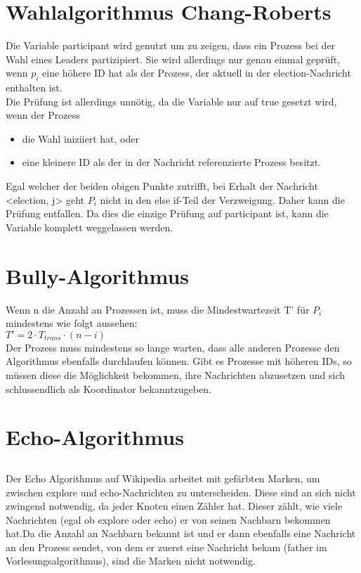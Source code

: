 \documentclass[a4paper,9pt]{article}
\begin{document}
\section{Wahlalgorithmus Chang-Roberts}
Die Variable participant wird genutzt um zu zeigen, dass ein Prozess bei der Wahl eines Leaders partizipiert. Sie wird allerdings nur genau einmal gepr\"uft, wenn $p_{i}$ eine h\"ohere ID hat als der Prozess, der aktuell in der election-Nachricht enthalten ist. \\
Die Pr\"ufung ist allerdings unn\"otig, da die Variable nur auf true gesetzt wird, wenn der Prozess
\begin{itemize}
\item die Wahl iniziiert hat, oder
\item eine kleinere ID als der in der Nachricht referenzierte Prozess besitzt.
\end{itemize}
Egal welcher der beiden obigen Punkte zutrifft, bei Erhalt der Nachricht \\
<election, j> geht $P_{i}$ nicht in den else if-Teil der Verzweigung. Daher kann die Pr\"ufung entfallen. Da dies die einzige Pr\"ufung auf participant ist, kann die Variable komplett weggelassen werden.

\section{Bully-Algorithmus}
Wenn n die Anzahl an Prozessen ist, muss die Mindestwartezeit T' f\"ur $P_{i}$ mindestens wie folgt aussehen: \\
$T' = 2 \cdot T_{trans} \cdot (n-i)$ \\
Der Prozess muss mindestens so lange warten, dass alle anderen Prozesse den Algorithmus ebenfalls durchlaufen k\"onnen. Gibt es Prozesse mit h\"oheren IDs, so m\"ussen diese die M\"oglichkeit bekommen, ihre Nachrichten abzusetzen und sich schlussendlich als Koordinator bekanntzugeben.

\section{Echo-Algorithmus}
\subsection{}
Der Echo Algorithmus auf Wikipedia arbeitet mit gef\"arbten Marken, um zwischen explore und echo-Nachrichten zu unterscheiden. Diese sind an sich nicht zwingend notwendig, da jeder Knoten einen Z\"ahler hat. Dieser z\"ahlt, wie viele Nachrichten (egal ob explore oder echo) er von seinen Nachbarn bekommen hat.Da die Anzahl an Nachbarn bekannt ist und er dann ebenfalls eine Nachricht an den Prozess sendet, von dem er zuerst eine Nachricht bekam (father im Vorlesungsalgorithmus), sind die Marken nicht notwendig.
\end{document}
